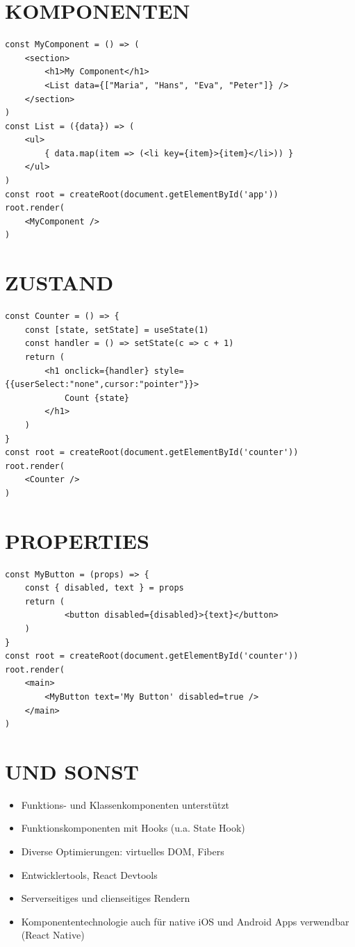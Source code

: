 \section*{KOMPONENTEN}
\begin{verbatim}
const MyComponent = () => (
    <section>
        <h1>My Component</h1>
        <List data={["Maria", "Hans", "Eva", "Peter"]} />
    </section>
)
const List = ({data}) => (
    <ul>
        { data.map(item => (<li key={item}>{item}</li>)) }
    </ul>
)
const root = createRoot(document.getElementById('app'))
root.render(
    <MyComponent />
)
\end{verbatim}

\section*{ZUSTAND}
\begin{verbatim}
const Counter = () => {
    const [state, setState] = useState(1)
    const handler = () => setState(c => c + 1)
    return (
        <h1 onclick={handler} style={{userSelect:"none",cursor:"pointer"}}>
            Count {state}
        </h1>
    )
}
const root = createRoot(document.getElementById('counter'))
root.render(
    <Counter />
)
\end{verbatim}

\section*{PROPERTIES}
\begin{verbatim}
const MyButton = (props) => {
    const { disabled, text } = props
    return (
            <button disabled={disabled}>{text}</button>
    )
}
const root = createRoot(document.getElementById('counter'))
root.render(
    <main>
        <MyButton text='My Button' disabled=true />
    </main>
)
\end{verbatim}

\section*{UND SONST}
\begin{itemize}
  \item Funktions- und Klassenkomponenten unterstützt
  \item Funktionskomponenten mit Hooks (u.a. State Hook)
  \item Diverse Optimierungen: virtuelles DOM, Fibers
  \item Entwicklertools, React Devtools
  \item Serverseitiges und clienseitiges Rendern
  \item Komponententechnologie auch für native iOS und Android Apps verwendbar (React Native)
\end{itemize}

